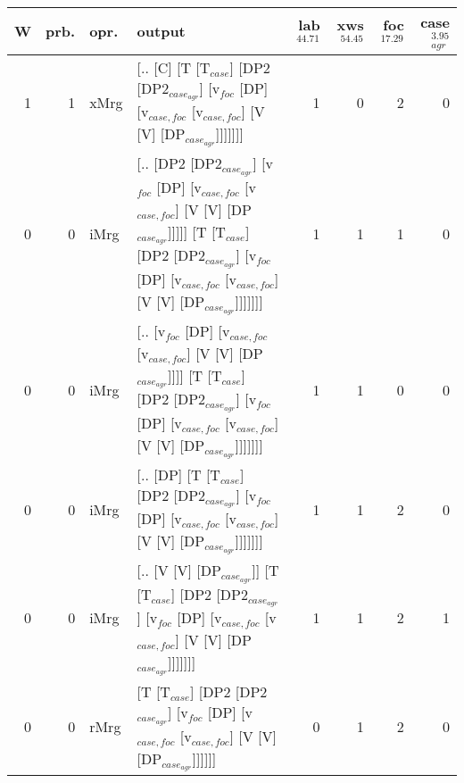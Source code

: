 \begin{tabularx}{\linewidth}{rrlXrrrr}
\hline
   W &   prb. & opr.   & output                                                                                                                                                                                &   lab$^{44.71}$ &   xws$^{54.45}$ &   foc$^{17.29}$ &   case$_{agr}^{3.95}$ \\
\hline
   1 &   1 & xMrg & [.. [C] [T [T$_{case}$] [DP2 [DP2$_{case_{agr}}$] [v$_{foc}$ [DP] [v$_{case,foc}$ [v$_{case,foc}$] [V [V] [DP$_{case_{agr}}$]]]]]]]                                                                               &             1 &             0 &             2 &                  0 \\
   0 &   0 & iMrg & [.. [DP2 [DP2$_{case_{agr}}$] [v$_{foc}$ [DP] [v$_{case,foc}$ [v$_{case,foc}$] [V [V] [DP$_{case_{agr}}$]]]]] [T [T$_{case}$] [DP2 [DP2$_{case_{agr}}$] [v$_{foc}$ [DP] [v$_{case,foc}$ [v$_{case,foc}$] [V [V] [DP$_{case_{agr}}$]]]]]]] &             1 &             1 &             1 &                  0 \\
   0 &   0 & iMrg & [.. [v$_{foc}$ [DP] [v$_{case,foc}$ [v$_{case,foc}$] [V [V] [DP$_{case_{agr}}$]]]] [T [T$_{case}$] [DP2 [DP2$_{case_{agr}}$] [v$_{foc}$ [DP] [v$_{case,foc}$ [v$_{case,foc}$] [V [V] [DP$_{case_{agr}}$]]]]]]]                      &             1 &             1 &             0 &                  0 \\
   0 &   0 & iMrg & [.. [DP] [T [T$_{case}$] [DP2 [DP2$_{case_{agr}}$] [v$_{foc}$ [DP] [v$_{case,foc}$ [v$_{case,foc}$] [V [V] [DP$_{case_{agr}}$]]]]]]]                                                                              &             1 &             1 &             2 &                  0 \\
   0 &   0 & iMrg & [.. [V [V] [DP$_{case_{agr}}$]] [T [T$_{case}$] [DP2 [DP2$_{case_{agr}}$] [v$_{foc}$ [DP] [v$_{case,foc}$ [v$_{case,foc}$] [V [V] [DP$_{case_{agr}}$]]]]]]]                                                             &             1 &             1 &             2 &                  1 \\
   0 &   0 & rMrg & [T [T$_{case}$] [DP2 [DP2$_{case_{agr}}$] [v$_{foc}$ [DP] [v$_{case,foc}$ [v$_{case,foc}$] [V [V] [DP$_{case_{agr}}$]]]]]]                                                                                        &             0 &             1 &             2 &                  0 \\
\hline
\end{tabularx}\endgroup\\
